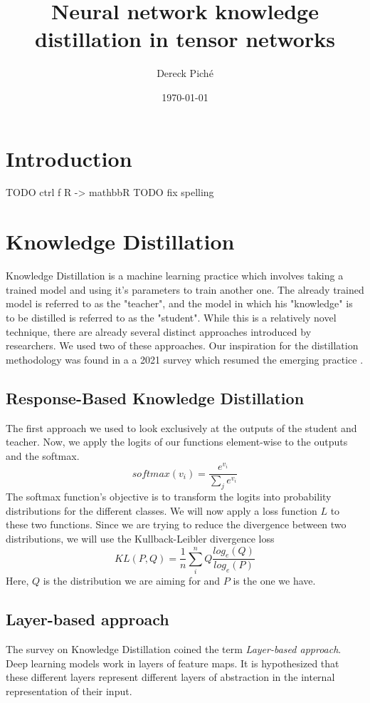 \documentclass[11pt]{article}
\title{Neural network knowledge distillation in tensor networks}
\author{Dereck Piché}
\date{\today}
\theoremstyle{definition}
\theoremstyle{definition}
\begin{document}
\maketitle

\begin{abstract}
\end{abstract}

\section{Introduction}
TODO ctrl f R -> mathbb{R}
TODO fix spelling


\section{Knowledge Distillation}
Knowledge Distillation is a machine learning practice which involves
taking a trained model and using it's parameters to train another one.
The already trained model is referred to as the "teacher", and 
the model in which his "knowledge" is to be distilled is referred to as
the "student". While this is a relatively novel technique, there are 
already several distinct approaches introduced by researchers.
We used two of these approaches. Our inspiration for the distillation 
methodology was found in a a 2021 survey which resumed the emerging 
practice \cite{Gou_2021}.

\subsection{Response-Based Knowledge Distillation}
The first approach we used to look exclusively at the outputs
of the student and teacher. Now, we apply the logits
of our functions element-wise to the outputs and the softmax.
\begin{equation}
    softmax(v_i) = \frac{e^{v_i}}{\sum_{j}{e^{v_i}}}
\end{equation}
The softmax function's objective is to transform the logits
into probability distributions for the different classes.
We will now apply a loss function $L$ to these two functions.
Since we are trying to reduce the divergence between 
two distributions, we will use the Kullback-Leibler divergence loss
\begin{equation}
    KL(P, Q) = \frac{1}{n} \sum_i^n Q \frac{log_e(Q)}{log_e(P)}
\end{equation}
Here, $Q$ is the distribution we are aiming for and $P$ is the one we have.

\subsection{Layer-based approach}
The survey on Knowledge Distillation coined the term {\it Layer-based approach}.
Deep learning models work in layers of feature maps. It is hypothesized that
these different layers represent different layers of abstraction in the internal
representation of their input. 
\end{document}

